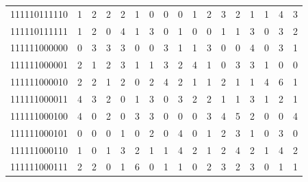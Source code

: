 \documentclass[10pt,a4paper]{article}
\begin{document}
\begin{longtable}{ |c|c|c|c|c|c|c|c|c|c|c|c|c|c|c|c|c| }
    111110111110              & 1                            & 2                                & 2                            & 2                              & 1   & 0   & 0   & 0   & 1   & 2   & 3   & 2   & 1   & 1   & 4   & 3   \\
    111110111111              & 1                            & 2                                & 0                            & 4                              & 1   & 3   & 0   & 1   & 0   & 0   & 1   & 1   & 3   & 0   & 3   & 2   \\
    111111000000              & 0                            & 3                                & 3                            & 3                              & 0   & 0   & 3   & 1   & 1   & 3   & 0   & 0   & 4   & 0   & 3   & 1   \\
    111111000001              & 2                            & 1                                & 2                            & 3                              & 1   & 1   & 3   & 2   & 4   & 1   & 0   & 3   & 3   & 1   & 0   & 0   \\
    111111000010              & 2                            & 2                                & 1                            & 2                              & 0   & 2   & 4   & 2   & 1   & 1   & 2   & 1   & 1   & 4   & 6   & 1   \\
    111111000011              & 4                            & 3                                & 2                            & 0                              & 1   & 3   & 0   & 3   & 2   & 2   & 1   & 1   & 3   & 1   & 2   & 1   \\
    111111000100              & 4                            & 0                                & 2                            & 0                              & 3   & 3   & 0   & 0   & 0   & 3   & 4   & 5   & 2   & 0   & 0   & 4   \\
    111111000101              & 0                            & 0                                & 0                            & 1                              & 0   & 2   & 0   & 4   & 0   & 1   & 2   & 3   & 1   & 0   & 3   & 0   \\
    111111000110              & 1                            & 0                                & 1                            & 3                              & 2   & 1   & 1   & 4   & 2   & 1   & 2   & 4   & 2   & 1   & 4   & 2   \\
    111111000111              & 2                            & 2                                & 0                            & 1                              & 6   & 0   & 1   & 1   & 0   & 2   & 3   & 2   & 3   & 0   & 1   & 1   \\

\end{longtable}
\end{document}
